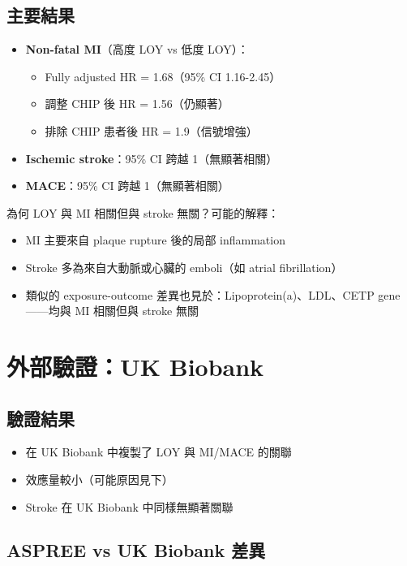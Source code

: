 \documentclass[12pt,a4paper]{article}
\newcommand{\note}[1]{
    \par
    \noindent
    \begin{tcolorbox}[
        colback=emergency_blue!5!white,
        colframe=emergency_blue,
        title=\textbf{重點提醒},
        fonttitle=\bfseries,
        boxrule=0.5pt,
        arc=3pt,
        left=6pt,
        right=6pt,
        top=6pt,
        bottom=6pt
    ]
    #1
    \end{tcolorbox}
}
\begin{document}
\subsection{主要結果}

\begin{itemize}
    \item \textbf{Non-fatal MI}（高度 LOY vs 低度 LOY）：
    \begin{itemize}
        \item Fully adjusted HR = 1.68（95\% CI 1.16-2.45）
        \item 調整 CHIP 後 HR = 1.56（仍顯著）
        \item 排除 CHIP 患者後 HR = 1.9（信號增強）
    \end{itemize}
    \item \textbf{Ischemic stroke}：95\% CI 跨越 1（無顯著相關）
    \item \textbf{MACE}：95\% CI 跨越 1（無顯著相關）
\end{itemize}

\note{
為何 LOY 與 MI 相關但與 stroke 無關？可能的解釋：
\begin{itemize}
    \item MI 主要來自 plaque rupture 後的局部 inflammation
    \item Stroke 多為來自大動脈或心臟的 emboli（如 atrial fibrillation）
    \item 類似的 exposure-outcome 差異也見於：Lipoprotein(a)、LDL、CETP gene——均與 MI 相關但與 stroke 無關
\end{itemize}
}

\section{外部驗證：UK Biobank}

\subsection{驗證結果}

\begin{itemize}
    \item 在 UK Biobank 中複製了 LOY 與 MI/MACE 的關聯
    \item 效應量較小（可能原因見下）
    \item Stroke 在 UK Biobank 中同樣無顯著關聯
\end{itemize}

\subsection{ASPREE vs UK Biobank 差異}
\end{document}
